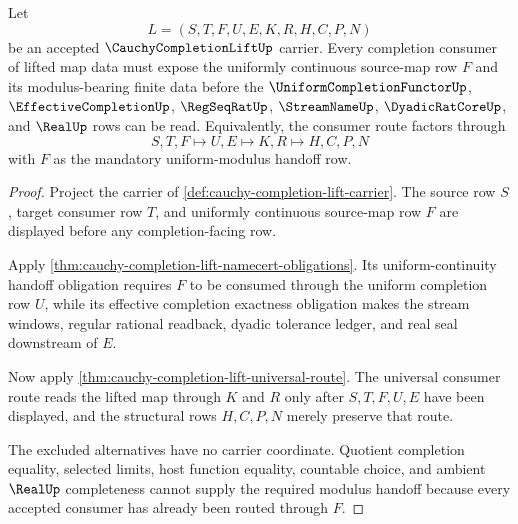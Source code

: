 \begin{theorem}
\label{thm:cauchy-completion-lift-uniform-modulus-handoff}
Let
$$
L=(S,T,F,U,E,K,R,H,C,P,N)
$$
be an accepted $\CauchyCompletionLiftUp$ carrier. Every completion consumer of lifted map data must expose the uniformly continuous source-map row $F$ and its modulus-bearing finite data before the $\UniformCompletionFunctorUp$, $\EffectiveCompletionUp$, $\RegSeqRatUp$, $\StreamNameUp$, $\DyadicRatCoreUp$, and $\RealUp$ rows can be read. Equivalently, the consumer route factors through
$$
S,T,F \longmapsto U,E \longmapsto K,R \longmapsto H,C,P,N
$$
with $F$ as the mandatory uniform-modulus handoff row.
\end{theorem}
\begin{proof}
Project the carrier of \autoref{def:cauchy-completion-lift-carrier}. The source row $S$, target consumer row $T$, and uniformly continuous source-map row $F$ are displayed before any completion-facing row.

Apply \autoref{thm:cauchy-completion-lift-namecert-obligations}. Its uniform-continuity handoff obligation requires $F$ to be consumed through the uniform completion row $U$, while its effective completion exactness obligation makes the stream windows, regular rational readback, dyadic tolerance ledger, and real seal downstream of $E$.

Now apply \autoref{thm:cauchy-completion-lift-universal-route}. The universal consumer route reads the lifted map through $K$ and $R$ only after $S,T,F,U,E$ have been displayed, and the structural rows $H,C,P,N$ merely preserve that route.

The excluded alternatives have no carrier coordinate. Quotient completion equality, selected limits, host function equality, countable choice, and ambient $\RealUp$ completeness cannot supply the required modulus handoff because every accepted consumer has already been routed through $F$.
\end{proof}


